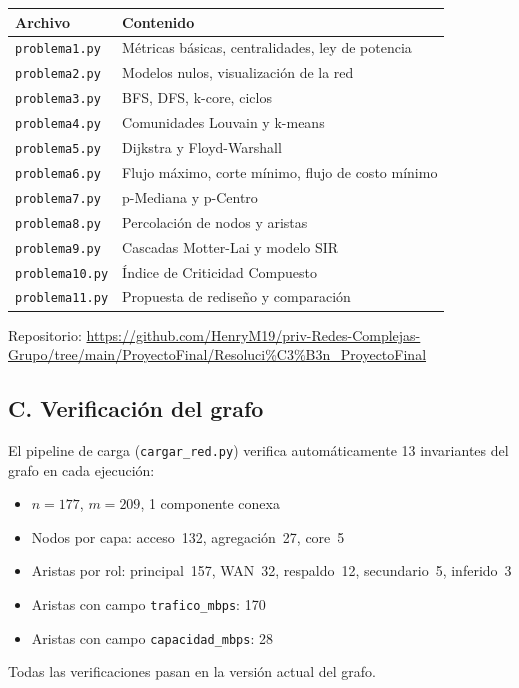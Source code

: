\documentclass[11pt, a4paper]{article}
\newcommand{\code}[1]{\texttt{\small #1}}
\begin{document}
\begin{center}
\small
\begin{tabular}{ll}
    \toprule
    \textbf{Archivo} & \textbf{Contenido} \\
    \midrule
    \code{problema1.py}  & Métricas básicas, centralidades, ley de potencia \\
    \code{problema2.py}  & Modelos nulos, visualización de la red \\
    \code{problema3.py}  & BFS, DFS, k-core, ciclos \\
    \code{problema4.py}  & Comunidades Louvain y k-means \\
    \code{problema5.py}  & Dijkstra y Floyd-Warshall \\
    \code{problema6.py}  & Flujo máximo, corte mínimo, flujo de costo mínimo \\
    \code{problema7.py}  & p-Mediana y p-Centro \\
    \code{problema8.py}  & Percolación de nodos y aristas \\
    \code{problema9.py}  & Cascadas Motter-Lai y modelo SIR \\
    \code{problema10.py} & Índice de Criticidad Compuesto \\
    \code{problema11.py} & Propuesta de rediseño y comparación \\
    \bottomrule
\end{tabular}
\end{center}

Repositorio: \url{https://github.com/HenryM19/priv-Redes-Complejas-Grupo/tree/main/ProyectoFinal/Resoluci%C3%B3n_ProyectoFinal}

\subsection*{C. Verificación del grafo}

El pipeline de carga (\code{cargar\_red.py}) verifica automáticamente 13
invariantes del grafo en cada ejecución:

\begin{itemize}
    \item $n = 177$, $m = 209$, 1 componente conexa
    \item Nodos por capa: acceso~132, agregación~27, core~5
    \item Aristas por rol: principal~157, WAN~32, respaldo~12,
          secundario~5, inferido~3
    \item Aristas con campo \code{trafico\_mbps}: 170
    \item Aristas con campo \code{capacidad\_mbps}: 28
\end{itemize}

Todas las verificaciones pasan en la versión actual del grafo.
\end{document}
